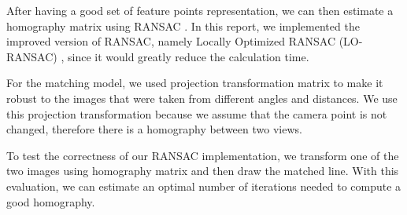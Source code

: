 After having a good set of feature points representation, we can then estimate a homography matrix using RANSAC \cite{RANSAC}.
In this report, we implemented the improved version of RANSAC, namely Locally Optimized RANSAC (LO-RANSAC) \cite{LORANSAC}, since it would greatly reduce the calculation time.

For the matching model, we used projection transformation matrix to make it robust to the images that were taken from different angles and distances.
We use this projection transformation because we assume that the camera point is not changed, therefore there is a homography between two views.

To test the correctness of our RANSAC implementation, we transform one of the two images using homography matrix and then draw the matched line.
With this evaluation, we can estimate an optimal number of iterations needed to compute a good homography.

